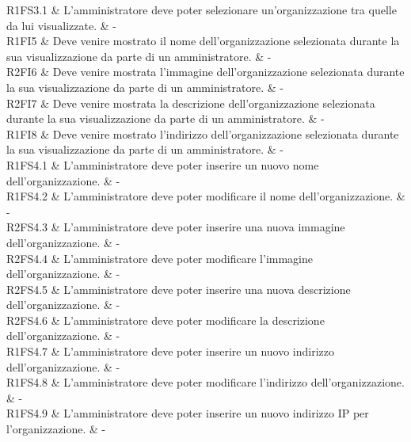 R1FS3.1 & L'amministratore deve poter selezionare un'organizzazione tra quelle da lui visualizzate.  & - \\

R1FI5 & Deve venire mostrato il nome dell'organizzazione selezionata durante la sua visualizzazione da parte di un amministratore. & - \\

R2FI6 & Deve venire mostrata l'immagine dell'organizzazione selezionata durante la sua visualizzazione da parte di un amministratore.  & - \\

R2FI7 & Deve venire mostrata la descrizione dell'organizzazione selezionata durante la sua visualizzazione da parte di un amministratore. & - \\

R1FI8 & Deve venire mostrato l'indirizzo dell'organizzazione selezionata durante la sua visualizzazione da parte di un amministratore.  & - \\

R1FS4.1 & L'amministratore deve poter inserire un nuovo nome dell'organizzazione. & - \\

R1FS4.2 & L'amministratore deve poter modificare il nome dell'organizzazione. & - \\

R2FS4.3 & L'amministratore deve poter inserire una nuova immagine dell'organizzazione. & - \\

R2FS4.4 & L'amministratore deve poter modificare l'immagine dell'organizzazione. & - \\

R2FS4.5 & L'amministratore deve poter inserire una nuova descrizione dell'organizzazione.  & - \\

R2FS4.6 & L'amministratore deve poter modificare la descrizione dell'organizzazione.  & - \\

R1FS4.7 & L'amministratore deve poter inserire un nuovo indirizzo dell'organizzazione. & - \\

R1FS4.8 & L'amministratore deve poter modificare l'indirizzo dell'organizzazione.  & - \\

R1FS4.9 & L'amministratore deve poter inserire un nuovo indirizzo IP per l'organizzazione.  & - \\

